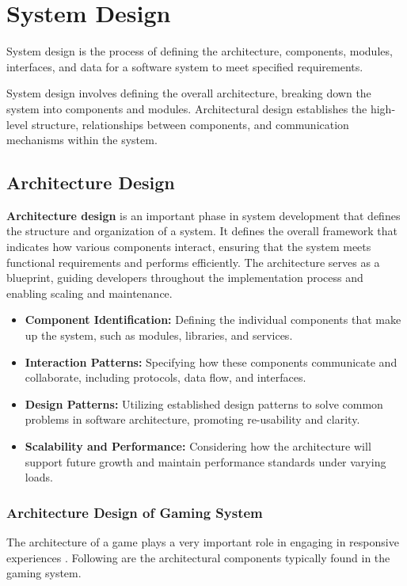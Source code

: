\chapter{System Design}

System design is the process of defining the \cite {hocking2022unity} architecture, components, modules, interfaces, and data for a software system to meet specified requirements.

System design involves defining the overall architecture, breaking down the system into components and modules. Architectural design establishes the high-level structure, relationships between components, and communication mechanisms within the system.

\section{Architecture Design}
\textbf{Architecture design} is an important phase in system development that defines the structure and organization of a system. It defines the overall framework that indicates how various components interact, ensuring that the system meets functional requirements and performs efficiently. The architecture serves as a blueprint, guiding developers throughout the implementation process and enabling scaling and maintenance.

\begin{itemize}
\item \textbf{Component Identification:} Defining the individual components that make up the system, such as modules, libraries, and services.
\item  \textbf{Interaction Patterns:} Specifying how these components communicate and collaborate, including protocols, data flow, and interfaces.
\item \textbf{Design Patterns:} Utilizing established design patterns to solve common problems in software architecture, promoting re-usability and clarity.
\item \textbf{Scalability and Performance:} Considering how the architecture will support future growth and maintain performance standards under varying loads.
\end{itemize}
\subsection{Architecture Design of Gaming System}

The architecture of a game plays a very important role in engaging in responsive experiences \cite{kleppmann2017designing}. Following are the architectural components typically found in the gaming system.


